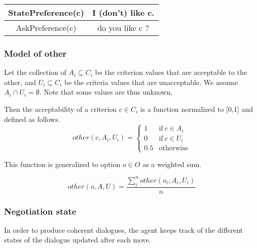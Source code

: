 \documentclass{llncs}
\begin{document}
		\begin{table}[h]
			\begin{tabular} {|c|c|}
				\hline
				\newline StatePreference(c) & I (don't) like c.\\
				\hline
				\newline AskPreference(c) & do you like c ?\\
				\hline
				
			\end{tabular}
		\end{table}
	
	\subsubsection{Model of other}
					
	Let the collection of $A_i \subseteq C_i$ be the criterion values that are acceptable to the other, and $U_i \subseteq C_i$ be the criteria values that are unacceptable.  We assume $A_i \cap U_i = \emptyset$.  Note	that some values are thus unknown.
	
	Then the acceptability of a criterion $c \in C_i$ is a function normalized to [0,1] and defined as follows.
	\begin{equation}
	other(c, A_i, U_i)= \left\{\begin{array}{ll}
	1	 & \mathrm{if\ }  c \in A_i\\
	0    & \mathrm{if\ }c \in U_i\\
	0.5	 & \mathrm{otherwise}
	\end{array}\right.
	\end{equation}
	
	
	This function is generalized to option $o \in O$ as a weighted sum.
	
	\begin{equation}
	other(o, A, U) = \frac{ \sum_{i}^{n} other(o_i, A_i, U_i) } {n}
	\end{equation}
	
	
	\subsubsection{Negotiation state}

	
	
	In order to produce coherent dialogues, the agent keeps track of the different states of the dialogue updated after each move. 
	
\end{document}
